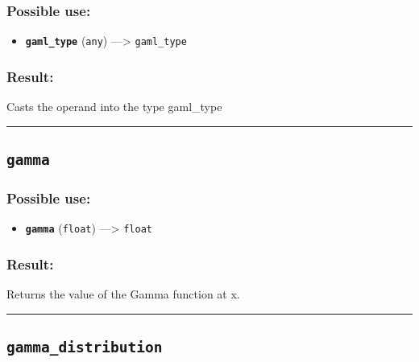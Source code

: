 \documentclass[]{book}
\providecommand{\tightlist}{%
  \setlength{\itemsep}{0pt}\setlength{\parskip}{0pt}}
\theoremstyle{definition}
\theoremstyle{definition}
\theoremstyle{definition}
\theoremstyle{remark}
\begin{document}
\subsubsection{Possible use:}\label{possible-use-179}

\begin{itemize}
\tightlist
\item
  \textbf{\texttt{gaml\_type}} (\texttt{any}) ---\textgreater{}
  \texttt{gaml\_type}
\end{itemize}

\subsubsection{Result:}\label{result-173}

Casts the operand into the type gaml\_type

\begin{center}\rule{0.5\linewidth}{\linethickness}\end{center}

\subsection{\texorpdfstring{\texttt{gamma}}{gamma}}\label{gamma}

\subsubsection{Possible use:}\label{possible-use-180}

\begin{itemize}
\tightlist
\item
  \textbf{\texttt{gamma}} (\texttt{float}) ---\textgreater{}
  \texttt{float}
\end{itemize}

\subsubsection{Result:}\label{result-174}

Returns the value of the Gamma function at x.

\begin{center}\rule{0.5\linewidth}{\linethickness}\end{center}

\subsection{\texorpdfstring{\texttt{gamma\_distribution}}{gamma\_distribution}}\label{gamma_distribution}
\end{document}
